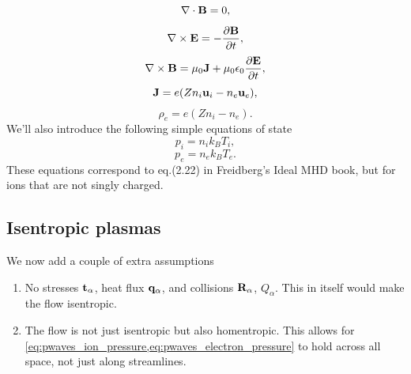 \documentclass[a4paper,11pt]{report}
\begin{document}
\begin{equation}
    \label{eq:twof_maxwell_4}
    \nabla \cdot \mathbf{B} = 0,
\end{equation}
\begin{equation}
    \label{eq:twof_maxwell_1}
    \nabla \times \mathbf{E} = -\frac{ \partial \mathbf{B}}{\partial t},
\end{equation}
\begin{equation}
    \label{eq:twof_maxwell_2}
    \nabla \times \mathbf{B} = \mu_0 \mathbf{J} + \mu_0 \epsilon_0 \frac{\partial \mathbf{E}}{\partial t},
\end{equation}
\begin{equation}
    \label{eq:twof_curr_density}
    \mathbf{J} = e (Z n_i \mathbf{u}_i - n_e \mathbf{u}_e),
\end{equation}
\begin{equation}
    \label{eq:twof_mass_density}
    \rho_e = e (Z n_i - n_e).
\end{equation}
We'll also introduce the following simple equations of state
\begin{equation}
    \label{eq:twof_eos_ion}
    p_i = n_i k_B T_i,
\end{equation}
\begin{equation}
    \label{eq:twof_eos_elec}
    p_e = n_e k_B T_e.
\end{equation}
These equations correspond to eq.\@ (2.22) in Freidberg's Ideal MHD book, but for ions that are not singly charged.

\subsection{Isentropic plasmas}
We now add a couple of extra assumptions
\begin{enumerate}
    \item No stresses $\mathbf{t}_\alpha$, heat flux $\mathbf{q}_\alpha$, and collisions $\mathbf{R}_\alpha$, $Q_\alpha$. This in itself would make the flow isentropic.
    \item The flow is not just isentropic but also homentropic. This allows for \cref{eq:pwaves_ion_pressure,eq:pwaves_electron_pressure} to hold across all space, not just along streamlines.
\end{enumerate}
\end{document}
